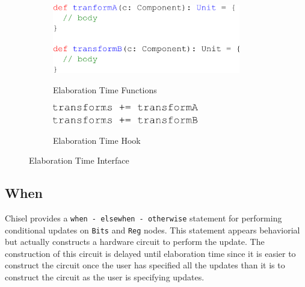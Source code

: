 \begin{figure}[htb]
\centering
  \begin{subfigure}[t]{0.48\textwidth}
  \centering
  \caption{Elaboration Time Functions}
  \includegraphics[width=0.9\textwidth]{figures/transform1.pdf}
  \label{fig:transform1}
  \end{subfigure}
  \hfill
  \begin{subfigure}[t]{0.48\textwidth}
  \centering
  \caption{Elaboration Time Hook}
  \includegraphics[width=0.7\textwidth]{figures/transform2.pdf}
  \label{fig:transform2}
  \end{subfigure}
\caption{Elaboration Time Interface}
\label{fig:transforms}
\end{figure}

\subsection{When}
Chisel provides a {\tt when - elsewhen - otherwise} statement for
performing conditional updates on {\tt Bits} and {\tt Reg}
nodes. This statement appears behaviorial but actually constructs a
hardware circuit to perform the update. The construction of this
circuit is delayed until elaboration time since it is easier to
construct the circuit once the user has specified all the updates than
it is to construct the circuit as the user is specifying
updates. 

